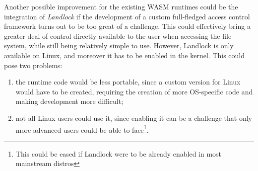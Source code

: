 Another possible improvement for the existing WASM runtimes could be the integration of \textit{Landlock}
if the development of a custom full-fledged access control framework turns out to be too great of
a challenge.
This could effectively bring a greater deal of control directly available to the user when
accessing the file system, while still being relatively simple to use.
However, Landlock is only available on Linux, and moreover it has to be enabled in the kernel.
This could pose two problems:
\begin{enumerate}
  \item the runtime code would be less portable, since a custom version for Linux would have to be created, requiring
        the creation of more OS-specific code and making development more difficult;
  \item not all Linux users could use it, since enabling it can be a challenge that only more advanced users
        could be able to face\footnote{This could be eased if Landlock were to be already enabled in most mainstream distros}.
\end{enumerate}
